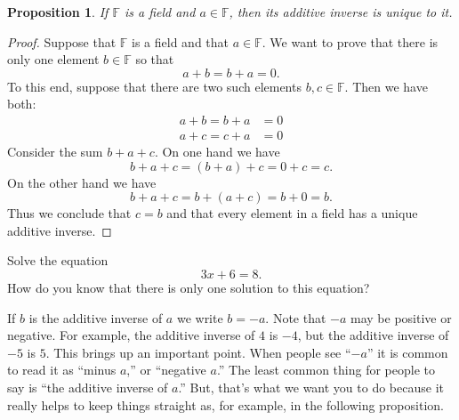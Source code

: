 \documentclass[11pt]{article}
\newenvironment{task}
	{\begin{mdframed}[linecolor=lightgray, linewidth=3pt]\raggedright}
	{\end{mdframed}}
\newtheorem{proposition}[theorem]{Proposition}
\theoremstyle{definition}
\begin{document}
\begin{proposition}
  If $\mathbb{F}$ is a field and $a\in \mathbb{F}$, then its additive inverse is unique to it.
\end{proposition}
\begin{proof}
  Suppose that $\mathbb{F}$ is a field and that $a\in\mathbb{F}$. We want to prove that there is only one element $b\in\mathbb{F}$ so that
  \[ a+b=b+a=0.\]
  To this end, suppose that there are two such elements $b,c\in\mathbb{F}$. Then we have both:
  \begin{align*}
    a + b = b + a &= 0\\
    a + c = c + a &= 0
  \end{align*}
  Consider the sum $b + a + c$. On one hand we have
  \[ b + a + c = (b+a) + c = 0 + c = c.\]
  On the other hand we have
  \[ b + a + c = b+ (a + c) = b + 0 = b.\]
  Thus we conclude that $c=b$ and that every element in a field has a unique additive inverse.
\end{proof}

\begin{task}
  Solve the equation 
  \[ 3x + 6 =8.\]
  How do you know that there is only one solution to this equation?
\end{task}

If $b$ is the additive inverse of $a$ we write $b = -a$. Note that $-a$ may be positive or negative. For example,
the additive inverse of $4$ is $-4$, but the additive inverse of $-5$ is $5$. This brings up an important point. 
When people see ``$-a$'' it is common to read it as ``minus $a$,'' or ``negative $a$.'' The least common thing for
people to say is ``the additive inverse of $a$.'' But, that's what we want you to do because it really helps to 
keep things straight as, for example, in the following proposition.
\end{document}

